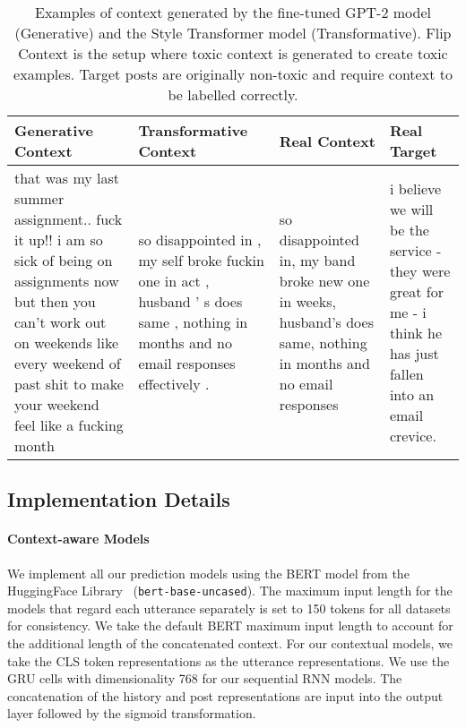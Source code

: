 \documentclass[acmsmall]{acmart}
\begin{document}
\begin{table*}[]
\begin{footnotesize}
\begin{tabular}{p{3cm}|p{3cm}|p{3cm}|p{3cm}}
\toprule 
\textbf{Generative Context} & \textbf{Transformative Context}  & \textbf{Real Context} & \textbf{Real Target}  \\
\midrule
that was my last summer assignment.. fuck it up!! i am so sick of being on assignments now but then you can't work out on weekends like every weekend of past shit to make your weekend feel like a fucking month & so disappointed in , my self broke fuckin one in act , husband ' s does same , nothing in months and no email responses effectively . & so disappointed in, my band broke new one in weeks, husband's does same, nothing in months and no email responses & i believe we will be the service - they were great for me - i think he has just fallen into an email crevice. \\ 
\bottomrule
\end{tabular}
\end{footnotesize}
\caption{\label{tab:gen-examples-context} Examples of context generated by the fine-tuned GPT-2 model (Generative) and the Style Transformer model (Transformative). Flip Context is the setup where toxic context is generated to create toxic examples. Target posts are originally non-toxic and require context to be labelled correctly.}
\end{table*}

\subsection{Implementation Details}

\paragraph{Context-aware Models} We implement all our prediction models using the BERT model from the HuggingFace Library~\cite{Wolf2019HuggingFacesTS} (\texttt{bert-base-uncased}).  The maximum input length for the models that regard each utterance separately is set to 150 tokens for all datasets for consistency. We take the default BERT maximum input length to account for the additional length of the concatenated context. For our contextual models, we take the CLS token representations as the utterance representations. We use the GRU cells with dimensionality 768 for our sequential RNN models. The concatenation of the history and post representations are input into the output layer followed by the sigmoid transformation. 
\end{document}

